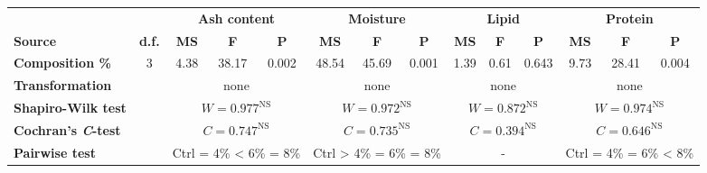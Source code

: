 \begin{tabular}{l@{\hspace{1ex}}ccccccccccccc}
	\toprule
		 &  & \multicolumn{3}{c}{\textbf{Ash content}} & \multicolumn{3}{c}{\textbf{Moisture}} & \multicolumn{3}{c}{\textbf{Lipid}} & \multicolumn{3}{c}{\textbf{Protein}} \\[\spheader]
		\textbf{Source} & \textbf{d.f.} & \textbf{MS} & \textbf{F} & \textbf{P} & \textbf{MS} & \textbf{F} & \textbf{P} & \textbf{MS} & \textbf{F} & \textbf{P} & \textbf{MS} & \textbf{F} & \textbf{P} \\
	\midrule
		\textbf{Composition \%} & \num{3} & \num{4.38} & \num{38.17} & \num{0.002} & \num{48.54} & \num{45,69} & \num{0,001} & \num{1.39} & \num{0.61} & \num{0.643} & \num{9.73} & \num{28.41} & \num{0.004} \\[\spbtwrowsA]
		\textbf{Transformation} &  & \multicolumn{3}{c}{none} & \multicolumn{3}{c}{none}& \multicolumn{3}{c}{none}& \multicolumn{3}{c}{none} \\[\spbtwrowsA]
		\textbf{Shapiro-Wilk test} &  & \multicolumn{3}{c}{$ W = \num{0,977}^{\text{NS}} $} & \multicolumn{3}{c}{$ W = \num{0,972}^{\text{NS}} $} & \multicolumn{3}{c}{$ W = \num{0,872}^{\text{NS}} $} & \multicolumn{3}{c}{$ W = \num{0,974}^{\text{NS}} $} \\[\spbtwrowsA]
		\textbf{Cochran's \emph{C}-test} &  & \multicolumn{3}{c}{$ C = \num{0,747}^{\text{NS}} $} & \multicolumn{3}{c}{$ C = \num{0,735}^{\text{NS}} $} & \multicolumn{3}{c}{$ C = \num{0,394}^{\text{NS}} $} & \multicolumn{3}{c}{$ C = \num{0,646}^{\text{NS}} $} \\[\spbtwrowsA]
		\textbf{Pairwise test} &  & \multicolumn{3}{c}{Ctrl = \num{4}\% < \num{6}\% = \num{8}\%} & \multicolumn{3}{c}{Ctrl > \num{4}\% = \num{6}\% = \num{8}\%}& \multicolumn{3}{c}{-}& \multicolumn{3}{c}{Ctrl = \num{4}\% = \num{6}\% < \num{8}\%} \\
	\bottomrule
\end{tabular}